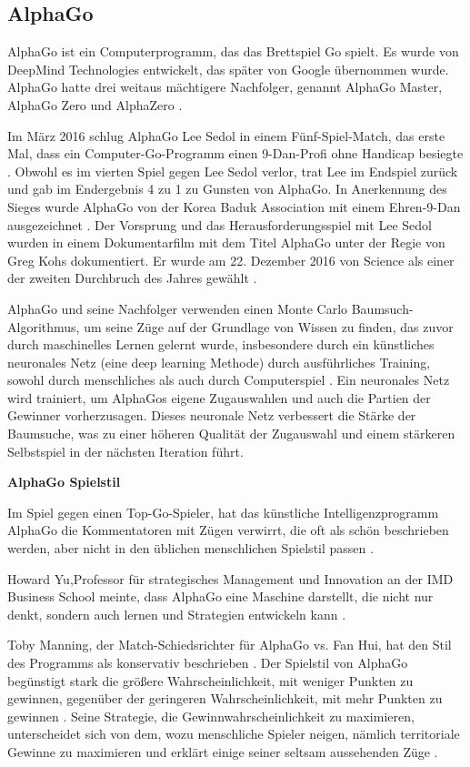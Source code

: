 \subsection{AlphaGo}
AlphaGo ist ein Computerprogramm, das das Brettspiel Go spielt\cite{BBC_NewsGo}. Es wurde von DeepMind Technologies entwickelt, das später von Google übernommen wurde. AlphaGo hatte drei weitaus mächtigere Nachfolger, genannt AlphaGo Master, AlphaGo Zero und AlphaZero \cite{DeepMind}.

Im März 2016 schlug AlphaGo Lee Sedol in einem Fünf-Spiel-Match, das erste Mal, dass ein Computer-Go-Programm einen 9-Dan-Profi ohne Handicap besiegte \cite{AlphaGoMatch}. Obwohl es im vierten Spiel gegen Lee Sedol verlor, trat Lee im Endspiel zurück und gab im Endergebnis 4 zu 1 zu Gunsten von AlphaGo. In Anerkennung des Sieges wurde AlphaGo von der Korea Baduk Association mit einem Ehren-9-Dan ausgezeichnet \cite{AlphaGoDan}. Der Vorsprung und das Herausforderungsspiel mit Lee Sedol wurden in einem Dokumentarfilm mit dem Titel AlphaGo \cite{AlphaGoFilm} unter der Regie von Greg Kohs dokumentiert. Er wurde am 22. Dezember 2016 von Science als einer der zweiten Durchbruch des Jahres gewählt \cite{Science2016}.

AlphaGo und seine Nachfolger verwenden einen Monte Carlo Baumsuch-Algorithmus, um seine Züge auf der Grundlage von Wissen zu finden, das zuvor durch maschinelles Lernen \glqq gelernt \grqq{} wurde, insbesondere durch ein künstliches neuronales Netz (eine deep learning Methode) durch ausführliches Training, sowohl durch menschliches als auch durch Computerspiel \cite{Silver_2016}. Ein neuronales Netz wird trainiert, um AlphaGos eigene Zugauswahlen und auch die Partien der Gewinner vorherzusagen. Dieses neuronale Netz verbessert die Stärke der Baumsuche, was zu einer höheren Qualität der Zugauswahl und einem stärkeren Selbstspiel in der nächsten Iteration führt.

\textbf{AlphaGo Spielstil}

Im Spiel gegen einen Top-Go-Spieler, hat das künstliche Intelligenzprogramm AlphaGo die Kommentatoren mit Zügen verwirrt, die oft als \glqq schön\grqq{} beschrieben werden, aber nicht in den üblichen menschlichen Spielstil passen \cite{Ribeiro2016}.


Howard Yu,Professor für strategisches Management und Innovation an der IMD Business School meinte, dass AlphaGo  eine Maschine darstellt, die nicht nur denkt, sondern auch lernen und Strategien entwickeln kann \cite{Ribeiro2016}.

Toby Manning, der Match-Schiedsrichter für AlphaGo vs. Fan Hui, hat den Stil des Programms als \glqq konservativ \grqq{} beschrieben \cite{Gibney2016}. Der Spielstil von AlphaGo begünstigt stark die größere Wahrscheinlichkeit, mit weniger Punkten zu gewinnen, gegenüber der geringeren Wahrscheinlichkeit, mit mehr Punkten zu gewinnen \cite{Ribeiro2016}. Seine Strategie, die Gewinnwahrscheinlichkeit zu maximieren, unterscheidet sich von dem, wozu menschliche Spieler neigen, nämlich territoriale Gewinne zu maximieren und erklärt einige seiner seltsam aussehenden Züge \cite{Chouard2016}.

